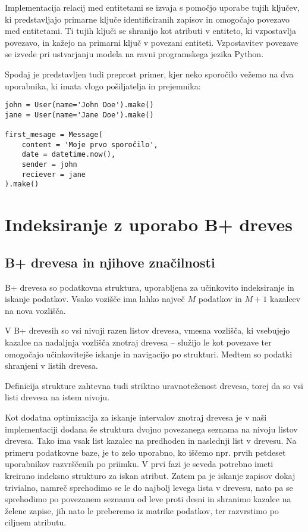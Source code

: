 \documentclass[a4paper,12pt,openright]{book}
\begin{document}
        Implementacija relacij med entitetami se izvaja s pomočjo uporabe tujih ključev, ki predstavljajo primarne ključe identificiranih zapisov in omogočajo povezavo med entitetami. Ti tujih ključi se shranijo kot atributi v entiteto, ki vzpostavlja povezavo, in kažejo na primarni ključ v povezani entiteti. Vzpostavitev povezave se izvede pri ustvarjanju modela na ravni programskega jezika Python.

        Spodaj je predstavljen tudi preprost primer, kjer neko sporočilo vežemo na dva uporabnika, ki imata vlogo pošiljatelja in prejemnika:
\begin{verbatim}
john = User(name='John Doe').make()
jane = User(name='Jane Doe').make()

first_mesage = Message(
    content = 'Moje prvo sporočilo',
    date = datetime.now(),
    sender = john
    reciever = jane
).make()
\end{verbatim}

    \section{Indeksiranje z uporabo B+ dreves}
        \subsection{B+ drevesa in njihove značilnosti}

        B+ drevesa so podatkovna struktura, uporabljena za učinkovito indeksiranje in iskanje podatkov.
        Vsako vozišče ima lahko največ $M$ podatkov in $M+1$ kazalcev na nova vozlišča.

        V B+ drevesih so vsi nivoji razen listov drevesa, vmesna vozlišča, ki vsebujejo kazalce na nadaljnja vozlišča znotraj drevesa – služijo le kot povezave ter omogočajo učinkovitejše iskanje in navigacijo po strukturi. Medtem so podatki shranjeni v listih drevesa.

        Definicija strukture zahtevna tudi striktno uravnoteženost drevesa, torej da so vsi listi drevesa na istem nivoju.

        Kot dodatna optimizacija za iskanje intervalov znotraj drevesa je v naši implementaciji dodana še struktura dvojno povezanega seznama na nivoju listov drevesa. Tako ima vsak list kazalec na predhoden in naslednji list v drevesu. Na primeru podatkovne baze, je to zelo uporabno, ko iščemo npr. prvih petdeset uporabnikov razvrščenih po priimku. V prvi fazi je seveda potrebno imeti kreirano indeksno strukturo za iskan atribut. Zatem pa je iskanje zapisov dokaj trivialno, namreč sprehodimo se le do najbolj levega lista v drevesu, nato pa se sprehodimo po povezanem seznamu od leve proti desni in shranimo kazalce na želene zapise, jih nato le preberemo iz matrike podatkov, ter razvrstimo po ciljnem atributu.
\end{document}
